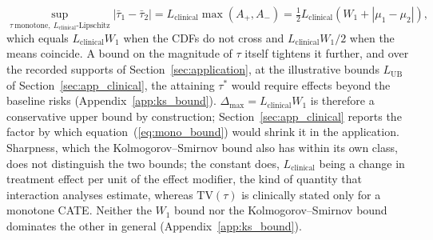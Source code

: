 \documentclass[AMA,Times1COL]{WileyNJDv5}
\begin{document}
\begin{equation}
\sup_{\tau\ \text{monotone},\ L_{\text{clinical}}\text{-Lipschitz}} |\bar{\tau}_1 - \bar{\tau}_2| = L_{\text{clinical}} \max(A_+, A_-) = \tfrac{1}{2} L_{\text{clinical}} \left( W_1 + |\mu_1 - \mu_2| \right),
\label{eq:mono_bound}
\end{equation}
which equals $L_{\text{clinical}} W_1$ when the CDFs do not cross and $L_{\text{clinical}} W_1 / 2$ when the means coincide. A bound on the magnitude of $\tau$ itself tightens it further, and over the recorded supports of Section~\ref{sec:application}, at the illustrative bounds $L_{\text{UB}}$ of Section~\ref{sec:app_clinical}, the attaining $\tau^*$ would require effects beyond the baseline risks (Appendix~\ref{app:ks_bound}). $\Delta_{\max} = L_{\text{clinical}} W_1$ is therefore a conservative upper bound by construction; Section~\ref{sec:app_clinical} reports the factor by which equation~(\ref{eq:mono_bound}) would shrink it in the application. Sharpness, which the Kolmogorov--Smirnov bound also has within its own class, does not distinguish the two bounds; the constant does, $L_{\text{clinical}}$ being a change in treatment effect per unit of the effect modifier, the kind of quantity that interaction analyses estimate, whereas $\mathrm{TV}(\tau)$ is clinically stated only for a monotone CATE. Neither the $W_1$ bound nor the Kolmogorov--Smirnov bound dominates the other in general (Appendix~\ref{app:ks_bound}).
\end{document}
